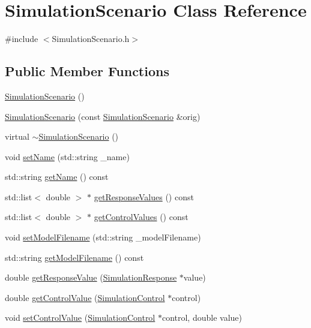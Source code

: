 \hypertarget{class_simulation_scenario}{}\section{Simulation\+Scenario Class Reference}
\label{class_simulation_scenario}


{\ttfamily \#include $<$Simulation\+Scenario.\+h$>$}

\subsection*{Public Member Functions}
\begin{DoxyCompactItemize}
\item 
\hyperlink{class_simulation_scenario_a765c34df448f223ea0c7c08631b3c5bf}{Simulation\+Scenario} ()
\item 
\hyperlink{class_simulation_scenario_a1eb84bad959ba23ee92a10e8d5d47cbc}{Simulation\+Scenario} (const \hyperlink{class_simulation_scenario}{Simulation\+Scenario} \&orig)
\item 
virtual \hyperlink{class_simulation_scenario_a4926deb52c192cd994cd57c753b985a6}{$\sim$\+Simulation\+Scenario} ()
\item 
void \hyperlink{class_simulation_scenario_a26d4cb5d3b9b9fbc5d23a70ef8a6f132}{set\+Name} (std\+::string \+\_\+name)
\item 
std\+::string \hyperlink{class_simulation_scenario_af724f4ff5cbdba527ee60c8cbaba0da0}{get\+Name} () const 
\item 
std\+::list$<$ double $>$ $\ast$ \hyperlink{class_simulation_scenario_a344580e94b9bbab4f89398cff8362620}{get\+Response\+Values} () const 
\item 
std\+::list$<$ double $>$ $\ast$ \hyperlink{class_simulation_scenario_adc766594ca8fe040cd4a0824d72ab69d}{get\+Control\+Values} () const 
\item 
void \hyperlink{class_simulation_scenario_ac9ac9d8dbec7e76c8c47e8f0d15d8406}{set\+Model\+Filename} (std\+::string \+\_\+model\+Filename)
\item 
std\+::string \hyperlink{class_simulation_scenario_a7c2e05a2502e9bb601305c1df4d92fd3}{get\+Model\+Filename} () const 
\item 
double \hyperlink{class_simulation_scenario_a771892cb0d3361006694713c1013cfbe}{get\+Response\+Value} (\hyperlink{class_simulation_response}{Simulation\+Response} $\ast$value)
\item 
double \hyperlink{class_simulation_scenario_aa12e1c77a7933773585f8683f36ca629}{get\+Control\+Value} (\hyperlink{class_simulation_control}{Simulation\+Control} $\ast$control)
\item 
void \hyperlink{class_simulation_scenario_a673e153baadc970e1cd4d97aa46b1af0}{set\+Control\+Value} (\hyperlink{class_simulation_control}{Simulation\+Control} $\ast$control, double value)
\end{DoxyCompactItemize}


